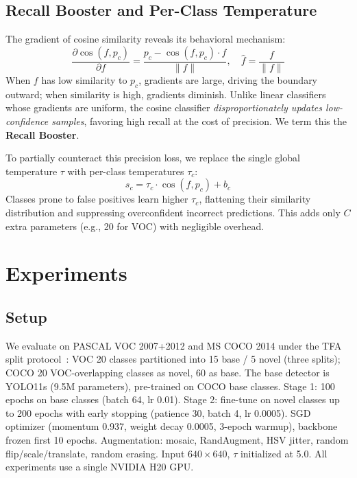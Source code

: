 \documentclass[conference]{IEEEtran}
\begin{document}
\subsection{Recall Booster and Per-Class Temperature}

The gradient of cosine similarity reveals its behavioral mechanism:
\begin{equation}
\frac{\partial\cos(f,p_c)}{\partial f} = \frac{p_c - \cos(f,p_c)\cdot\hat{f}}{\|f\|}, \quad \hat{f}=\frac{f}{\|f\|}
\label{eq:gradient}
\end{equation}
When $f$ has low similarity to $p_c$, gradients are large, driving the boundary outward; when similarity is high, gradients diminish. Unlike linear classifiers whose gradients are uniform, the cosine classifier \textit{disproportionately updates low-confidence samples}, favoring high recall at the cost of precision. We term this the \textbf{Recall Booster}.

To partially counteract this precision loss, we replace the single global temperature $\tau$ with per-class temperatures $\tau_c$:
\begin{equation}
s_c = \tau_c \cdot \cos(f, p_c) + b_c
\label{eq:pertemp}
\end{equation}
Classes prone to false positives learn higher $\tau_c$, flattening their similarity distribution and suppressing overconfident incorrect predictions. This adds only $C$ extra parameters (e.g., 20 for VOC) with negligible overhead.

\section{Experiments}

\subsection{Setup}

We evaluate on PASCAL VOC 2007+2012 and MS COCO 2014 under the TFA split protocol~\cite{wang2020tfa}: VOC 20 classes partitioned into 15 base / 5 novel (three splits); COCO 20 VOC-overlapping classes as novel, 60 as base. The base detector is YOLO11s (9.5M parameters), pre-trained on COCO base classes. Stage 1: 100 epochs on base classes (batch 64, lr 0.01). Stage 2: fine-tune on novel classes up to 200 epochs with early stopping (patience 30, batch 4, lr 0.0005). SGD optimizer (momentum 0.937, weight decay 0.0005, 3-epoch warmup), backbone frozen first 10 epochs. Augmentation: mosaic, RandAugment, HSV jitter, random flip/scale/translate, random erasing. Input $640\times640$, $\tau$ initialized at 5.0. All experiments use a single NVIDIA H20 GPU.
\end{document}

